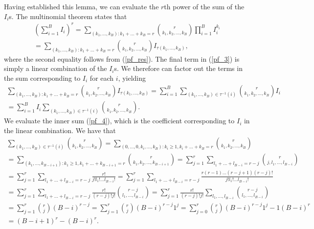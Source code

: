 \documentclass[12pt]{article}
\begin{document}
\begin{appendices}
Having established this lemma, we can evaluate the $r$th power of the sum of the $I_i$s. The multinomial theorem states that
\begin{multline}\label{pf_3}
\left( \sum_{i=1}^B I_i \right)^r = \sum_{(k_1, \dots, k_B):k_1 + \dots + k_B = r} \binom{ r }{k_1, k_2, \dots, k_B} \prod_{i=1}^B I^{k_i}_i \\ = \sum_{(k_1, \dots, k_B):k_1 + \dots + k_B = r} \binom{r}{k_1, k_2, \dots, k_B} I_{\tau(k_1, \dots, k_B)},
\end{multline}
where the second equality follows from (\ref{pf_res}). The final term in (\ref{pf_3}) is simply a linear combination of the $I_i$s. We therefore can factor out the terms in the sum corresponding to $I_i$ for each $i$, yielding
\begin{multline}\label{pf_4}
\sum_{(k_1, \dots, k_B):k_1 + \dots + k_B = r} \binom{r}{k_1, k_2, \dots, k_B} I_{\tau(k_1, \dots, k_B)} = \sum_{i=1}^B \sum_{(k_1, \dots, k_B) \in \tau^{-1}(i)} \binom{r}{k_1, k_2,\dots, k_B} I_i \\ = \sum_{i=1}^B I_i \sum_{ (k_1, \dots, k_B) \in \tau^{-1}(i)} \binom{r}{k_1, k_2,\dots, k_B}.
\end{multline}
We evaluate the inner sum (\ref{pf_4}), which is the coefficient corresponding to $I_i$ in the linear combination. We have that
\begin{multline}\label{pf_5}
 \sum_{ (k_1, \dots, k_B) \in \tau^{-1}(i)} \binom{r}{k_1, k_2,\dots, k_B} =  \sum_{( 0, \dots, 0, k_i, \dots, k_B): k_i \geq 1, k_i + \dots + k_B = r} \binom{r}{k_1, k_2, \dots, k_B} \\ = \sum_{(k_1, \dots, k_{B - i + 1}) : k_1 \geq 1, k_1 + \dots + k_{B - i + 1} = r} \binom{r}{k_1, k_2, \dots, k_{B - i + 1} } = \sum_{j=1}^r \sum_{l_1 + \dots + l_{B - i} = r - j} \binom{r}{ j, l_1, \dots, l_{B-i}} \\ = \sum_{j=1}^r \sum_{ l_1 + \dots + l_{B-i} = r-j } \frac{ r! }{ j! l_1! \dots l_{B-i}!} = \sum_{j=1}^r \sum_{l_1 + \dots + l_{B-i} = r-j} \frac{r(r-1)\dots(r-j+1)(r-j)!}{ j! l_1! \dots l_{B-i}!}  \\ = \sum_{j=1}^r \sum_{l_1 + \dots + l_{B-i} = r - j} \frac{r!}{(r-j)!j!} \binom{r-j}{l_1, \dots, l_{B-i}} = \sum_{j=1}^r \frac{r!}{(r-j)!j!} \sum_{l_1, \dots, l_{B-i}} \binom{r-j}{l_1, \dots, l_{B-i}} \\ = \sum_{j=1}^r \binom{r}{j} (B-i)^{r-j}  = \sum_{j=1}^r \binom{r}{j} (B-i)^{r-j} 1^j = \sum_{j=0}^r \binom{r}{j} (B-i)^{r-j}1^j  - 1(B-i)^r \\ = (B - i + 1)^r - (B-i)^r.

\end{multline}
\end{appendices}
\end{document}

